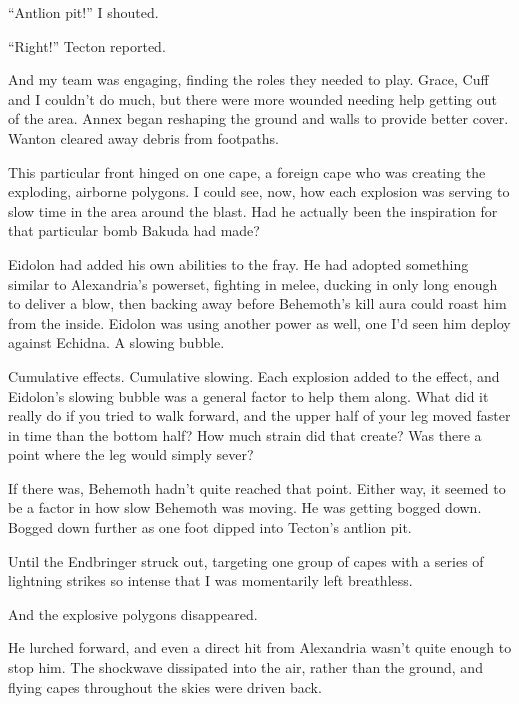 ``Antlion pit!'' I shouted.



``Right!'' Tecton reported.



And my team was engaging, finding the roles they needed to play.  Grace, Cuff and I couldn't do much, but there were more wounded needing help getting out of the area.  Annex began reshaping the ground and walls to provide better cover.  Wanton cleared away debris from footpaths.



This particular front hinged on one cape, a foreign cape who was creating the exploding, airborne polygons.  I could see, now, how each explosion was serving to slow time in the area around the blast.  Had he actually been the inspiration for that particular bomb Bakuda had made?



Eidolon had added his own abilities to the fray.  He had adopted something similar to Alexandria's powerset, fighting in melee, ducking in only long enough to deliver a blow, then backing away before Behemoth's kill aura could roast him from the inside.  Eidolon was using another power as well, one I'd seen him deploy against Echidna.  A slowing bubble.



Cumulative effects.  Cumulative slowing.  Each explosion added to the effect, and Eidolon's slowing bubble was a general factor to help them along.  What did it really do if you tried to walk forward, and the upper half of your leg moved faster in time than the bottom half?  How much strain did that create?  Was there a point where the leg would simply sever?



If there was, Behemoth hadn't quite reached that point.  Either way, it seemed to be a factor in how slow Behemoth was moving.  He was getting bogged down.  Bogged down further as one foot dipped into Tecton's antlion pit.



Until the Endbringer struck out, targeting one group of capes with a series of lightning strikes so intense that I was momentarily left breathless.



And the explosive polygons disappeared.



He lurched forward, and even a direct hit from Alexandria wasn't quite enough to stop him.  The shockwave dissipated into the air, rather than the ground, and flying capes throughout the skies were driven back.



